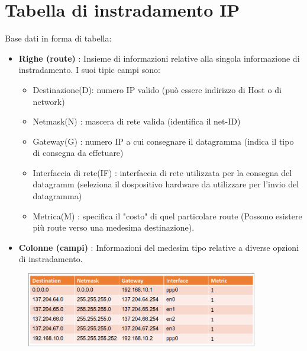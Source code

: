 \documentclass{report}
\begin{document}
            \section{Tabella di instradamento IP}
                Base dati in forma di tabella:
                \begin{itemize}
                    \item \textbf{Righe (route)} : Insieme di informazioni relative alla singola informazione di instradamento. I suoi tipic campi sono:
                    \begin{itemize}
                        \item Destinazione(D): numero IP valido (può essere indirizzo di Host o di network)
                        \item Netmask(N) : mascera di rete valida (identifica il net-ID)
                        \item Gateway(G) : numero IP a cui consegnare il datagramma (indica il tipo di consegna da effetuare)
                        \item Interfaccia di rete(IF) : interfaccia di rete utilizzata per la consegna del datagramm (seleziona il dospositivo hardware da utilizzare per l'invio del datagramma)
                        \item Metrica(M) : specifica il "costo" di quel particolare route (Possono esistere più route verso una medesima destinazione).
                    \end{itemize}
                    \item \textbf{Colonne (campi)} : Informazioni del medesim tipo relative a diverse opzioni di instradamento.
                \end{itemize} 
                \begin{figure}[H]
                    \includegraphics[width=0.9\textwidth]{1/tabR.png}
                \end{figure}
\end{document}

